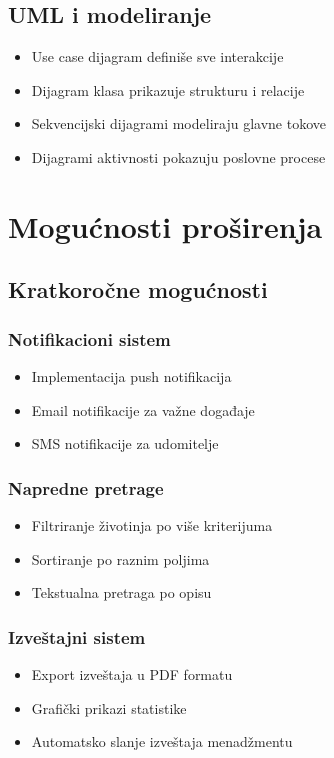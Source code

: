 \subsection{UML i modeliranje}

\begin{itemize}
    \item Use case dijagram definiše sve interakcije
    \item Dijagram klasa prikazuje strukturu i relacije
    \item Sekvencijski dijagrami modeliraju glavne tokove
    \item Dijagrami aktivnosti pokazuju poslovne procese
\end{itemize}

\section{Mogućnosti proširenja}

\subsection{Kratkoročne mogućnosti}

\subsubsection{Notifikacioni sistem}
\begin{itemize}
    \item Implementacija push notifikacija
    \item Email notifikacije za važne događaje
    \item SMS notifikacije za udomitelje
\end{itemize}

\subsubsection{Napredne pretrage}
\begin{itemize}
    \item Filtriranje životinja po više kriterijuma
    \item Sortiranje po raznim poljima
    \item Tekstualna pretraga po opisu
\end{itemize}

\subsubsection{Izveštajni sistem}
\begin{itemize}
    \item Export izveštaja u PDF formatu
    \item Grafički prikazi statistike
    \item Automatsko slanje izveštaja menadžmentu
\end{itemize}

